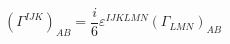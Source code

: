 \begin{equation}
(\Gamma ^{IJK})_{AB} = \frac{i}{6}\varepsilon ^{IJKLMN} (\Gamma
_{LMN})_{AB} \label{c5}
\end{equation}

